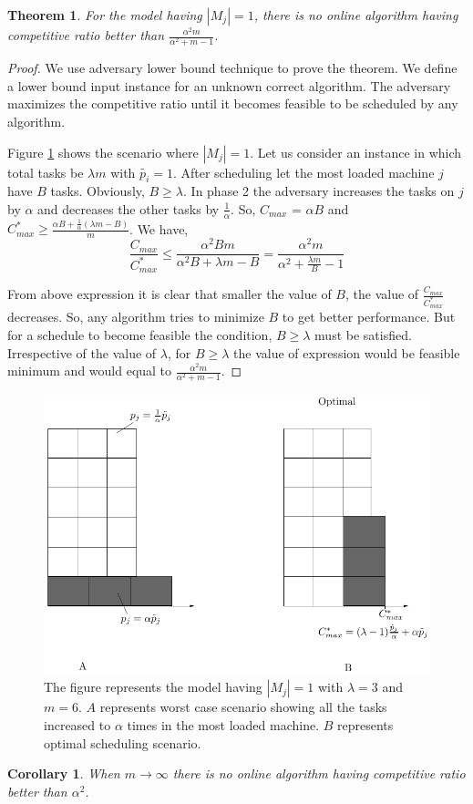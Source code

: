 \documentclass[10pt, conference, compsocconf]{IEEEtran}
\newtheorem{theorem}{Theorem}[section]
\newtheorem{corollary}{Corollary}[theorem]
\begin{document}
\begin{theorem}
For the model having $|M_j| = 1$, there is no online algorithm having competitive ratio better than  $\frac{\alpha^{2}m }{\alpha^{2} + m-1}$.
\end{theorem} 
\begin{proof}
We use adversary lower bound technique to prove the theorem. We define a lower bound input instance for an unknown correct algorithm. The adversary maximizes the competitive ratio until it becomes feasible to be scheduled by any algorithm.
 
Figure \ref{fig:rara} shows the scenario where $|M_j|=1$.  Let us consider an instance in which total tasks be $\lambda m$ with $\tilde{p_i}=1$. After scheduling let the most loaded machine $j$ have $B$ tasks. Obviously, $B \geq \lambda$. In phase 2 the adversary  increases the tasks on $j$ by $\alpha$ and decreases the other tasks by $\frac{1}{\alpha}$. So, $ C_{max}$ = $\alpha B$ and ${C^{*}_{max}}\geq \frac{\alpha B + \frac{1}{\alpha }  (\lambda  m - B) }{m}$. We have,  
 \begin{equation}\nonumber
\frac{C_{max}}{C^{*}_{max}}\leq \frac{\alpha^{2} B m }{\alpha^{2} B + \lambda m - B}=\frac{\alpha^{2}  m }{\alpha^{2}  + \frac{\lambda m}{B}  - 1}
 \end{equation} 
 
  From above expression it is clear that smaller the value of $B$, the value of $\frac{C_{max}}{C^{*}_{max}}$ decreases. So, any algorithm
  tries to minimize $B$ to get better performance.  But for a schedule to become feasible the condition, $B \geq \lambda$ must  be satisfied. Irrespective of the value of $\lambda$, for $ B \geq \lambda $ the value of expression would be feasible minimum and would equal to   $\frac{\alpha^{2}m }{\alpha^{2} + m-1}$.
\end{proof}    
  
  
  \begin{figure}[htp]
  \centering
  \includegraphics[width= 8 cm]{model1.pdf}
  \caption{ The figure represents the model having $|M_j|= 1$ with
  $\lambda = 3$ and $m = 6$. $A$ represents worst case scenario showing all the tasks increased to $\alpha$ times in the most loaded machine. $B$ represents   optimal scheduling scenario.  }
  \label{fig:rara}
  \end{figure}
  \begin{corollary}
  When $m\rightarrow \infty$ there is no online algorithm having competitive ratio better than $\alpha^{2}$.
  \end{corollary}
  
\end{document}

